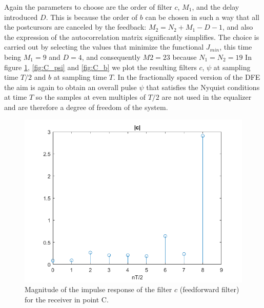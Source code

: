\documentclass[a4paper,11.5pt]{article}
\begin{document}
Again the parameters to choose are the order of filter $c$, $M_1$, and the delay introduced $D$. This is because the order of $b$ can be chosen in such a way that all the postcursors are canceled by the feedback: $M_2=N_2+M_1-D-1$, and also the expression of the autocorrelation matrix significantly simplifies. The choice is carried out by selecting the values that minimize the functional $J_{min}$, this time being $M_1=9$ and $D=4$, and consequently $M2=23$ because $N_1=N_2=19$  In figure \ref{fig:C_c}, \ref{fig:C_psi} and \ref{fig:C_b} we plot the resulting filters $c$, $\psi$ at sampling time $T/2$ and $b$ at sampling time $T$. In the fractionally spaced version of the DFE the aim is again to obtain an overall pulse $\psi$ that satisfies the Nyquist conditions at time $T$ so the samples at even multiples of $T/2$ are not used in the equalizer and are therefore a degree of freedom of the system.

\begin{figure}[ht]
	\begin{center}   
		\includegraphics[width=\textwidth]{figs/C_c.png} 
		\caption{Magnitude of the impulse response of the filter $c$ (feedforward filter) for the receiver in point C.}
		\label{fig:C_c}
	\end{center}
\end{figure}
\end{document}
